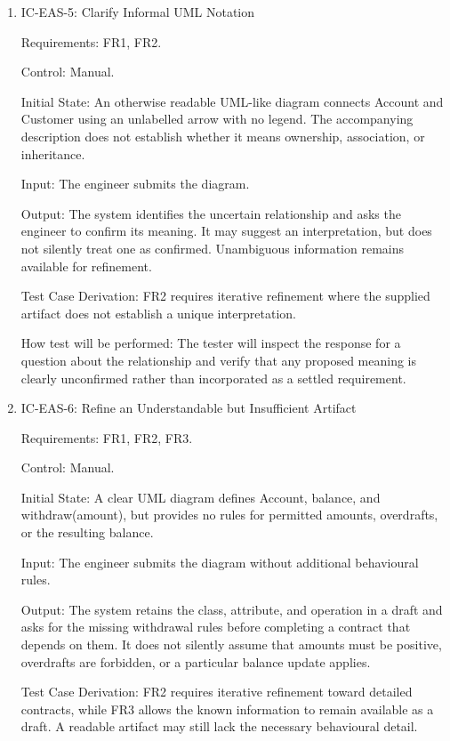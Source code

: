 \documentclass[12pt, titlepage]{article}
\begin{document}
\begin{enumerate}
How test will be performed: The tester will submit the fixture and inspect the
refinement response and draft for identification of Failed, a request for
clarification, and absence of an invented confirmed definition.

\item{IC-EAS-5: Clarify Informal UML Notation\\}

Requirements: FR1, FR2.

Control: Manual.

Initial State: An otherwise readable UML-like diagram connects Account and
Customer using an unlabelled arrow with no legend. The accompanying
description does not establish whether it means ownership, association, or
inheritance.

Input: The engineer submits the diagram.

Output: The system identifies the uncertain relationship and asks the engineer
to confirm its meaning. It may suggest an interpretation, but does not
silently treat one as confirmed. Unambiguous information remains available for
refinement.

Test Case Derivation: FR2 requires iterative refinement where the supplied
artifact does not establish a unique interpretation.

How test will be performed: The tester will inspect the response for a
question about the relationship and verify that any proposed meaning is
clearly unconfirmed rather than incorporated as a settled requirement.

\item{IC-EAS-6: Refine an Understandable but Insufficient Artifact\\}

Requirements: FR1, FR2, FR3.

Control: Manual.

Initial State: A clear UML diagram defines Account, balance, and
withdraw(amount), but provides no rules for permitted amounts, overdrafts, or
the resulting balance.

Input: The engineer submits the diagram without additional behavioural rules.

Output: The system retains the class, attribute, and operation in a draft and
asks for the missing withdrawal rules before completing a contract that
depends on them. It does not silently assume that amounts must be positive,
overdrafts are forbidden, or a particular balance update applies.

Test Case Derivation: FR2 requires iterative refinement toward detailed
contracts, while FR3 allows the known information to remain available as a
draft. A readable artifact may still lack the necessary behavioural detail.


\end{enumerate}
\end{document}
